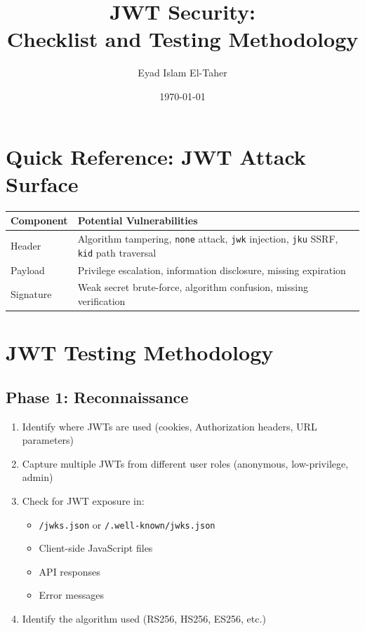 \documentclass{article}
\title{JWT Security: \\ Checklist and Testing Methodology}
\author{Eyad Islam El-Taher}
\date{\today}
\begin{document}
\maketitle

\section{Quick Reference: JWT Attack Surface}

\begin{tabularx}{\textwidth}{|X|X|}
\hline
\textbf{Component} & \textbf{Potential Vulnerabilities} \\
\hline
Header & Algorithm tampering, \texttt{none} attack, \texttt{jwk} injection, \texttt{jku} SSRF, \texttt{kid} path traversal \\
\hline
Payload & Privilege escalation, information disclosure, missing expiration \\
\hline
Signature & Weak secret brute-force, algorithm confusion, missing verification \\
\hline
\end{tabularx}

\section{JWT Testing Methodology}

\subsection{Phase 1: Reconnaissance}

\begin{methodologybox}
\begin{enumerate}
    \item Identify where JWTs are used (cookies, Authorization headers, URL parameters)
    \item Capture multiple JWTs from different user roles (anonymous, low-privilege, admin)
    \item Check for JWT exposure in:
    \begin{itemize}
        \item \texttt{/jwks.json} or \texttt{/.well-known/jwks.json}
        \item Client-side JavaScript files
        \item API responses
        \item Error messages
    \end{itemize}
    \item Identify the algorithm used (RS256, HS256, ES256, etc.)
\end{enumerate}
\end{methodologybox}
\end{document}
